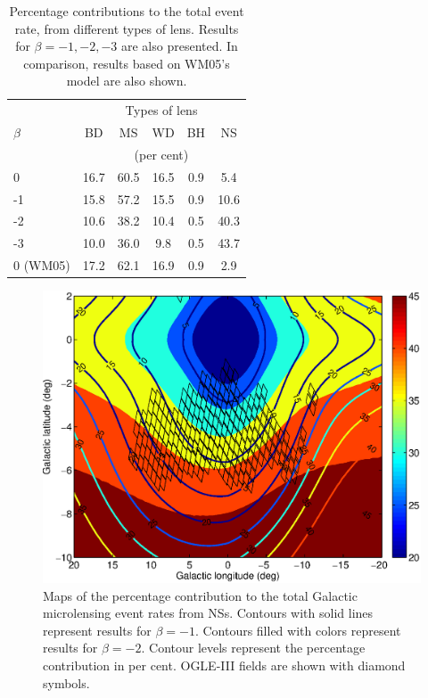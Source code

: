 \documentclass[iop,apj]{emulateapj}
\begin{document}
%
%
%
\begin{table}
\begin{center}
\caption{Percentage contributions to the total event rate, from
different types of lens. Results for $\beta=-1,-2,-3$ are also presented.
In comparison, results based on WM05's model are also shown.}
%
\begin{tabular}{lccccc}
\hline
             &       \multicolumn{5}{c}{Types of lens}      \\
$\beta$      & BD   &    MS    &    WD     &  BH   & NS     \\
             &       \multicolumn{5}{c}{(per cent)}         \\
\hline
0            & 16.7 &    60.5  &    16.5   &  0.9  & 5.4    \\
-1           & 15.8 &    57.2  &    15.5   &  0.9  & 10.6   \\        
-2           & 10.6 &    38.2  &    10.4   &  0.5  & 40.3   \\         
-3           & 10.0 &    36.0  &    9.8    &  0.5  & 43.7   \\            
0 (WM05)     & 17.2 &    62.1  &    16.9   &  0.9  & 2.9    \\
\hline
\end{tabular}
%
\end{center}
%
\end{table}
%
%
\begin{figure}
\begin{center}
  \includegraphics[width=3.5 in]{map_percentage.eps}
%
\caption{Maps of the percentage contribution to the total Galactic microlensing event rates
from NSs. Contours with solid lines represent results for $\beta=-1$. Contours filled
with colors represent results for $\beta=-2$.  Contour levels represent the percentage contribution
in per cent. OGLE-III fields are shown with diamond symbols. }
\label{map_percentage}
\end{center}
\end{figure}
%
%
\end{document}
